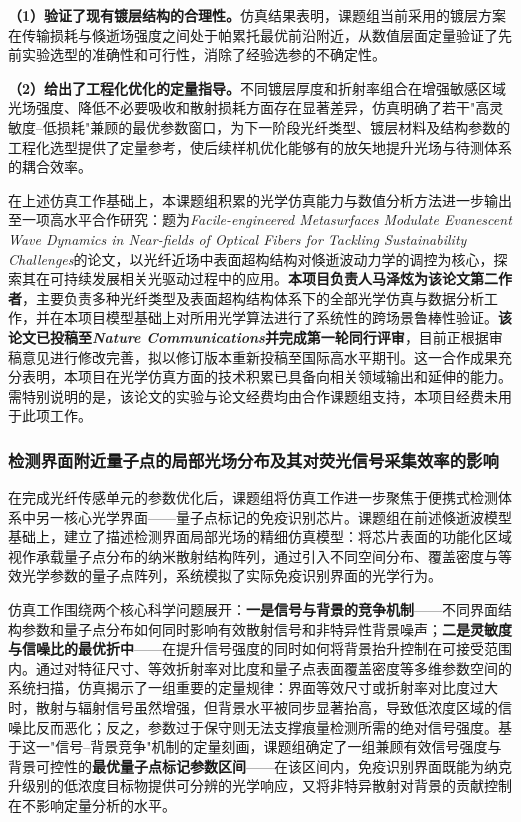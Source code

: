\documentclass[12pt,a4paper]{article}
\begin{document}
\textbf{（1）验证了现有镀层结构的合理性。}仿真结果表明，课题组当前采用的镀层方案在传输损耗与倏逝场强度之间处于帕累托最优前沿附近，从数值层面定量验证了先前实验选型的准确性和可行性，消除了经验选参的不确定性。

\textbf{（2）给出了工程化优化的定量指导。}不同镀层厚度和折射率组合在增强敏感区域光场强度、降低不必要吸收和散射损耗方面存在显著差异，仿真明确了若干"高灵敏度--低损耗"兼顾的最优参数窗口，为下一阶段光纤类型、镀层材料及结构参数的工程化选型提供了定量参考，使后续样机优化能够有的放矢地提升光场与待测体系的耦合效率。

在上述仿真工作基础上，本课题组积累的光学仿真能力与数值分析方法进一步输出至一项高水平合作研究：题为\textit{Facile-engineered Metasurfaces Modulate Evanescent Wave Dynamics in Near-fields of Optical Fibers for Tackling Sustainability Challenges}的论文，以光纤近场中表面超构结构对倏逝波动力学的调控为核心，探索其在可持续发展相关光驱动过程中的应用。\textbf{本项目负责人马泽炫为该论文第二作者}，主要负责多种光纤类型及表面超构结构体系下的全部光学仿真与数据分析工作，并在本项目模型基础上对所用光学算法进行了系统性的跨场景鲁棒性验证。\textbf{该论文已投稿至\textit{Nature Communications}并完成第一轮同行评审}，目前正根据审稿意见进行修改完善，拟以修订版本重新投稿至国际高水平期刊。这一合作成果充分表明，本项目在光学仿真方面的技术积累已具备向相关领域输出和延伸的能力。需特别说明的是，该论文的实验与论文经费均由合作课题组支持，本项目经费未用于此项工作。

\subsubsection{检测界面附近量子点的局部光场分布及其对荧光信号采集效率的影响}

在完成光纤传感单元的参数优化后，课题组将仿真工作进一步聚焦于便携式检测体系中另一核心光学界面——量子点标记的免疫识别芯片。课题组在前述倏逝波模型基础上，建立了描述检测界面局部光场的精细仿真模型：将芯片表面的功能化区域视作承载量子点分布的纳米散射结构阵列，通过引入不同空间分布、覆盖密度与等效光学参数的量子点阵列，系统模拟了实际免疫识别界面的光学行为。

仿真工作围绕两个核心科学问题展开：\textbf{一是信号与背景的竞争机制}——不同界面结构参数和量子点分布如何同时影响有效散射信号和非特异性背景噪声；\textbf{二是灵敏度与信噪比的最优折中}——在提升信号强度的同时如何将背景抬升控制在可接受范围内。通过对特征尺寸、等效折射率对比度和量子点表面覆盖密度等多维参数空间的系统扫描，仿真揭示了一组重要的定量规律：界面等效尺寸或折射率对比度过大时，散射与辐射信号虽然增强，但背景水平被同步显著抬高，导致低浓度区域的信噪比反而恶化；反之，参数过于保守则无法支撑痕量检测所需的绝对信号强度。基于这一"信号--背景竞争"机制的定量刻画，课题组确定了一组兼顾有效信号强度与背景可控性的\textbf{最优量子点标记参数区间}——在该区间内，免疫识别界面既能为纳克升级别的低浓度目标物提供可分辨的光学响应，又将非特异散射对背景的贡献控制在不影响定量分析的水平。
\end{document}
